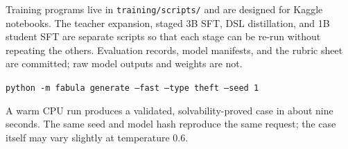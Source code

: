﻿\documentclass[11pt,a4paper]{report}
\begin{document}
Training programs live in \texttt{training/scripts/} and are designed for Kaggle notebooks. The teacher expansion, staged 3B SFT, DSL distillation, and 1B student SFT are separate scripts so that each stage can be re-run without repeating the others. Evaluation records, model manifests, and the rubric sheet are committed; raw model outputs and weights are not.

\vspace{0.6cm}
\begin{keybox}
\begin{center}
\texttt{python -m fabula generate --fast --type theft --seed 1}
\end{center}
A warm CPU run produces a validated, solvability-proved case in about nine seconds. The same seed and model hash reproduce the same request; the case itself may vary slightly at temperature 0.6.
\end{keybox}
\end{document}
